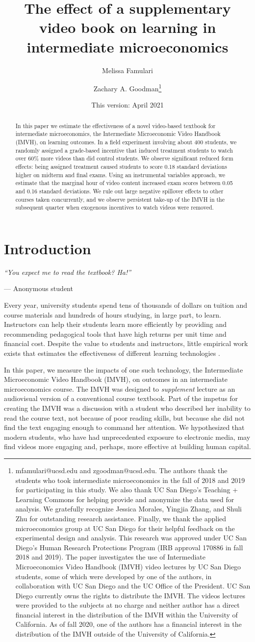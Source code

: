 \documentclass[12pt]{article}
\title{The effect of a supplementary video book on learning in intermediate microeconomics}
\author{Melissa Famulari}
\author{Zachary A. Goodman\thanks{mfamulari@ucsd.edu and zgoodman@ucsd.edu. The authors thank the students who took intermediate microeconomics in the fall of 2018 and 2019 for participating in this study. We also thank UC San Diego's Teaching + Learning Commons for helping provide and anonymize the data used for analysis. We gratefully recognize Jessica Morales, Yingjia Zhang, and Shuli Zhu for outstanding research assistance. Finally, we thank the applied microeconomics group at UC San Diego for their helpful feedback on the experimental design and analysis. This research was approved under UC San Diego's Human Research Protections Program (IRB approval 170886 in fall 2018 and 2019). The paper investigates the use of Intermediate Microeconomics Video Handbook (IMVH) video lectures by UC San Diego students, some of which were developed by one of the authors, in collaboration with UC San Diego and the UC Office of the President. UC San Diego currently owns the rights to distribute the IMVH. The videos lectures were provided to the subjects at no charge and neither author has a direct financial interest in the distribution of the IMVH within the University of California. As of fall 2020, one of the authors has a financial interest in the distribution of the IMVH outside of the University of California.}}
\affil{University of California, San Diego}
\date{This version: April 2021} %
\begin{document}

\maketitle
\begin{abstract}
	In this paper we estimate the effectiveness of a novel video-based textbook for intermediate microeconomics, the Intermediate Microeconomic Video Handbook (IMVH), on learning outcomes. In a field experiment involving about 400 students, we randomly assigned a grade-based incentive that induced treatment students to watch over 60\% more videos than did control students. We observe significant reduced form effects: being assigned treatment caused students to score 0.18 standard deviations higher on midterm and final exams. Using an instrumental variables approach, we estimate that the marginal hour of video content increased exam scores between 0.05 and 0.16 standard deviations. We rule out large negative spillover effects to other courses taken concurrently, and we observe persistent take-up of the IMVH in the subsequent quarter when exogenous incentives to watch videos were removed.
\end{abstract}


\section{Introduction}

\epigraph{\textit{``You expect me to read the textbook? Ha!''}}{--- Anonymous student}\bigskip

Every year, university students spend tens of thousands of dollars on tuition and course materials and hundreds of hours studying, in large part, to learn. Instructors can help their students learn more efficiently by providing and recommending pedagogical tools that have high returns per unit time and financial cost. Despite the value to students and instructors, little empirical work exists that estimates the effectiveness of different learning technologies \parencite{aws2015}.

In this paper, we measure the impacts of one such technology, the Intermediate Microeconomic Video Handbook (IMVH), on outcomes in an intermediate microeconomics course. The IMVH was designed to \textit{supplement} lecture as an audiovisual version of a conventional course textbook. Part of the impetus for creating the IMVH was a discussion with a student who described her inability to read the course text, not because of poor reading skills, but because she did not find the text engaging enough to command her attention. We hypothesized that modern students, who have had unprecedented exposure to electronic media, may find videos more engaging and, perhaps, more effective at building human capital.
\end{document}
